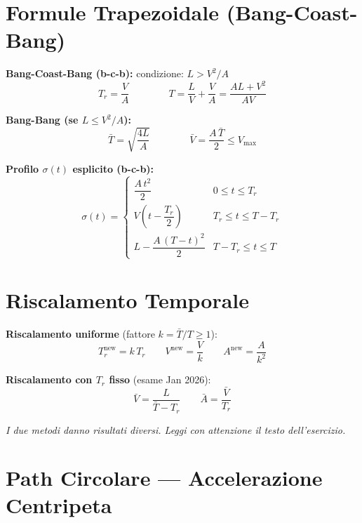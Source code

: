 \documentclass[10pt,a4paper]{article}
\begin{document}
\newpage
\section{Formule Trapezoidale (Bang-Coast-Bang)}

\begin{amberbox}
\textbf{Bang-Coast-Bang (b-c-b):} \quad condizione: $L > V^2/A$
\[
T_r = \frac{V}{A} \qquad\qquad T = \frac{L}{V} + \frac{V}{A} = \frac{AL + V^2}{AV}
\]

\textbf{Bang-Bang (se $L \leq V^2/A$):}
\[
\bar{T} = \sqrt{\frac{4L}{A}} \qquad\qquad \bar{V} = \frac{A\,\bar{T}}{2} \leq V_{\max}
\]

\textbf{Profilo $\sigma(t)$ esplicito (b-c-b):}
\[
\sigma(t) =
\begin{cases}
\dfrac{A\,t^2}{2} & 0 \leq t \leq T_r \\[8pt]
V\!\left(t - \dfrac{T_r}{2}\right) & T_r \leq t \leq T - T_r \\[8pt]
L - \dfrac{A\,(T-t)^2}{2} & T - T_r \leq t \leq T
\end{cases}
\]
\end{amberbox}

\section{Riscalamento Temporale}

\begin{cyanbox}
\textbf{Riscalamento uniforme} (fattore $k = \bar{T}/T \geq 1$):
\[
T_r^{\text{new}} = k\,T_r \qquad V^{\text{new}} = \frac{V}{k} \qquad A^{\text{new}} = \frac{A}{k^2}
\]

\textbf{Riscalamento con $T_r$ fisso} (esame Jan 2026):
\[
\bar{V} = \frac{L}{\bar{T} - T_r} \qquad \bar{A} = \frac{\bar{V}}{T_r}
\]

\textit{I due metodi danno risultati diversi. Leggi con attenzione il testo dell'esercizio.}
\end{cyanbox}

\section{Path Circolare --- Accelerazione Centripeta}
\end{document}
